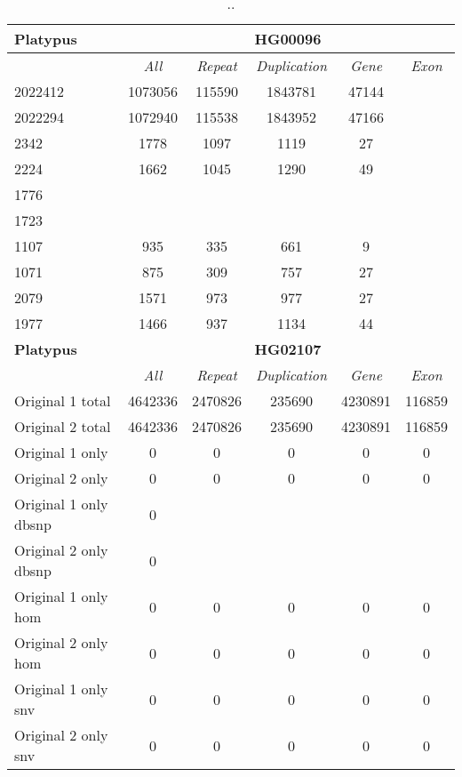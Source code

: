 \begin{table}[htb]
\begin{center}
\begin{tabular}{|l|c||c|c|c|c|}
\hline
{\bf Platypus} & \multicolumn{5}{|c|}{\bf HG00096} \\
\hline
\cline{2-6}
{\bf} & {\it All} & {\it Repeat} & {\it Duplication} & {\it Gene} & {\it Exon} \\
\hline
2022412 & 1073056 & 115590 & 1843781 & 47144\\ 
\hline
2022294 & 1072940 & 115538 & 1843952 & 47166\\ 
\hline
2342 & 1778 & 1097 & 1119 & 27\\ 
\hline
2224 & 1662 & 1045 & 1290 & 49\\ 
\hline
1776 &  &  &  & \\ 
\hline
1723 &  &  &  & \\ 
\hline
1107 & 935 & 335 & 661 & 9\\ 
\hline
1071 & 875 & 309 & 757 & 27\\ 
\hline
2079 & 1571 & 973 & 977 & 27\\ 
\hline
1977 & 1466 & 937 & 1134 & 44\\ 
\hline
\hline
{\bf Platypus} & \multicolumn{5}{|c|}{\bf HG02107} \\
\hline
\cline{2-6}
{\bf} & {\it All} & {\it Repeat} & {\it Duplication} & {\it Gene} & {\it Exon} \\
\hline
Original 1 total & 4642336 & 2470826 & 235690 & 4230891 & 116859\\ 
\hline
Original 2 total & 4642336 & 2470826 & 235690 & 4230891 & 116859\\ 
\hline
Original 1 only & 0 & 0 & 0 & 0 & 0\\ 
\hline
Original 2 only & 0 & 0 & 0 & 0 & 0\\ 
\hline
Original 1 only dbsnp & 0 &  &  &  & \\ 
\hline
Original 2 only dbsnp & 0 &  &  &  & \\ 
\hline
Original 1 only hom & 0 & 0 & 0 & 0 & 0\\ 
\hline
Original 2 only hom & 0 & 0 & 0 & 0 & 0\\ 
\hline
Original 1 only snv & 0 & 0 & 0 & 0 & 0\\ 
\hline
Original 2 only snv & 0 & 0 & 0 & 0 & 0\\ 
\hline
\end{tabular}
\end{center}
\caption{ .. }
\label{tab:orig-vs-shuf-platypus}
\end{table}

